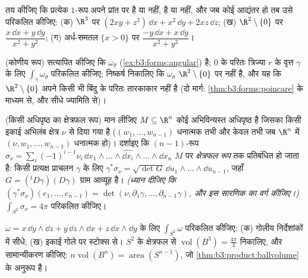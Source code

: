 \begin{exercise}[$\star\star$]\label{exo:b3:forms:3}
तय कीजिए कि प्रत्येक $1$-रूप अपने प्रांत पर  है या नहीं,
 है या नहीं, और जब कोई आद्यंतर हो तब उसे परिकलित कीजिए:
(क) $\R^3$ पर $(2xy + z^2)\,\dd x + x^2\,\dd y + 2xz\,\dd z$;
(ख) $\R^2\setminus\{0\}$ पर $\dfrac{x\,\dd x + y\,\dd y}{x^2 + y^2}$;
(ग) अर्ध-समतल $\{x > 0\}$ पर $\dfrac{-y\,\dd x + x\,\dd y}{x^2 + y^2}$।
\end{exercise}

\begin{exercise}[$\star\star$]\label{exo:b3:forms:4}
(कोणीय रूप) सत्यापित कीजिए कि $\omega_\theta$ (\cref{ex:b3:forms:angular})  है; $0$ के
परितः त्रिज्या $r$ के वृत्त $\gamma$ के लिए $\int_\gamma\omega_\theta$ परिकलित कीजिए;
निष्कर्ष निकालिए कि $\omega_\theta$ $\R^2\setminus\{0\}$ पर  नहीं है, और यह कि $\R^2\setminus\{0\}$
अपने किसी भी बिंदु के परितः तारकाकार नहीं है (दो मार्ग: \cref{thm:b3:forms:poincare} के
माध्यम से, और सीधे ज्यामिति से)।
\end{exercise}

\begin{exercise}[$\star\star$]\label{exo:b3:forms:5}
(किसी अधिपृष्ठ का क्षेत्रफल रूप) मान लीजिए $M \subseteq \R^n$ कोई 
अभिविन्यस्त अधिपृष्ठ है जिसका  किसी इकाई अभिलंब क्षेत्र
$\nu$ से दिया गया है ($(w_1, \dots, w_{n-1})$ धनात्मक तभी और केवल तभी जब $\R^n$ में
$(\nu, w_1, \dots, w_{n-1})$ धनात्मक हो)। दर्शाइए कि $(n-1)$-रूप $\sigma_\nu =
\sum_i(-1)^{i-1}\nu_i\,\dd x_1\wedge\dots\wedge\widehat{\dd
x_i}\wedge\dots\wedge\dd x_n$ $M$ पर
\emph{क्षेत्रफल रूप} तक प्रतिबंधित हो जाता है: किसी प्रत्यक्ष
प्राचलन $\gamma$ के लिए $\gamma^*\sigma_\nu = \sqrt{\det G}\,\dd u_1\wedge\dots
\wedge\dd u_{n-1}$, जहाँ $G = ({}^t D\gamma)(D\gamma)$ ग्राम आव्यूह है।
\emph{(ध्यान दीजिए कि $(\gamma^*\sigma_\nu)(e_1, \dots, e_{n-1}) = \det(\nu,
\partial_1\gamma, \dots, \partial_{n-1}\gamma)$, और इस सारणिक का वर्ग कीजिए।)} $\int_{S^2}\sigma_\nu = 4\pi$
परिकलित कीजिए।
\end{exercise}

\begin{exercise}[$\star\star$]\label{exo:b3:forms:6}
$\omega = x\,\dd y\wedge\dd z
+ y\,\dd z\wedge\dd x + z\,\dd x\wedge\dd y$ के लिए $\int_{S^2}\omega$ परिकलित कीजिए: (क) गोलीय निर्देशांकों में सीधे;
(ख) इकाई गोले पर स्टोक्स से। $S^2$ के क्षेत्रफल से $\operatorname{vol}(B^3) = \frac{4\pi}3$ निकालिए,
और सामान्यीकरण कीजिए: $n\operatorname{vol}(B^n) = \operatorname{area}(S^{n-1})$, जो \cref{thm:b3:product:ballvolume} के अनुरूप है।
\end{exercise}

